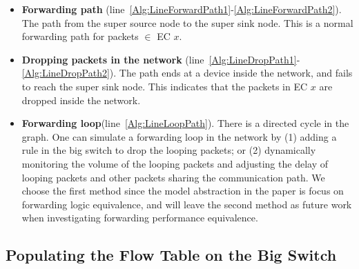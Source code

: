 \begin{itemize}
\item \textbf{Forwarding path} (line~\ref{Alg:LineForwardPath1}-\ref{Alg:LineForwardPath2}).
        The path from the super source node to the super sink node.
        This is a normal forwarding path for packets $\in$ EC $x$.
        
\item \textbf{Dropping packets in the network} (line~\ref{Alg:LineDropPath1}-\ref{Alg:LineDropPath2}).
        The path ends at a device inside the network, and fails to reach the super sink node. This indicates that the packets in EC $x$ are dropped inside the network.
        
\item \textbf{Forwarding loop}(line~\ref{Alg:LineLoopPath}).
        There is a directed cycle in the graph. One can simulate a forwarding loop in the network by (1) adding a rule in the big switch to drop the looping packets; or (2) dynamically monitoring the volume of the looping packets and adjusting the delay of looping packets and other packets sharing the communication path. We choose the first method since the model abstraction in the paper is focus on forwarding logic equivalence, and will leave the second method as future work when investigating forwarding performance equivalence. 
\end{itemize}

\subsection{Populating the Flow Table on the Big Switch}\label{sec:thirdstep}

